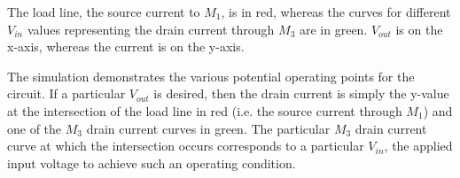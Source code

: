 \FloatBarrier

{\footnotesize The load line, the source current to $M_1$, is in red, whereas the curves for different $V_{in}$ values representing the drain current through $M_3$ are in green. $V_{out}$ is on the x-axis, whereas the current is on the y-axis.}

\FloatBarrier

The simulation demonstrates the various potential operating points for the circuit. If a particular $V_{out}$ is desired, then the drain current is simply the y-value at the intersection of the load line in red (i.e. the source current through $M_1$) and one of the $M_3$ drain current curves in green. The particular $M_3$ drain current curve at which the intersection occurs corresponds to a particular $V_{in}$, the applied input voltage to achieve such an operating condition.
